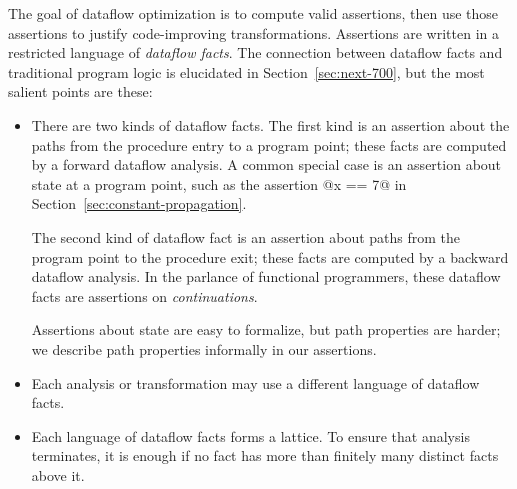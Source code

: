 \documentclass[blockstyle,preprint,nocopyrightspace]{sigplanconf}
\newcommand{\authornote}[1]{{\em #1}}
\def\authornote#1{\unskip\relax}
\newcommand{\simon}[1]{\authornote{SLPJ: #1}}
\newcommand{\john}[1]{\authornote{JD: #1}}
\newcommand\secref[1]{Section~\ref{sec:#1}}
\begin{document}
The goal of dataflow optimization is to compute valid
assertions, then use those assertions to justify code-improving
transformations.
%
%
Assertions are written in a restricted
language of \emph{dataflow facts}.\john{Almost sounds like we're restricting the language}
\simon{Exactly!  That was one reason I rewrote this stuff on Weds.}
The connection between dataflow facts and
\ifpagetuning\else traditional \fi
program logic is
elucidated in \secref{next-700}, but the most salient points are
these:
\begin{itemize}
\item
There are two kinds of dataflow facts.
The first kind is an assertion about the paths from the procedure
entry to a program point;
these facts are computed by a forward dataflow analysis.
A common special case is an assertion about state at a program point,
such as the assertion @x == 7@ in \secref{constant-propagation}.

The second kind of dataflow fact is an assertion about paths from the program point
to the procedure exit;
these facts are computed by a backward dataflow analysis.
In the parlance of functional programmers, these dataflow facts are assertions on
\emph{continuations}.

Assertions about state are easy to formalize, but path properties are harder;
we describe path properties informally in our assertions.
\simon{Shall we mention that typically forward
analysis use the former and backwards the latter?}
\simon{Side remark (not for paper): I was wondering about the difference
between ``state'' and ``continuation'', why so different?  Actually it
is perhaps not so different.  In a backward analysis, an 
assertion tells you something about what will happen from this 
program point onwards; in a forward analysis the assertion tells you
something about what has happened up to this point.
In general, a forward analysis could compute more stuff than assertions
about the program state at this moment in time; for example, you could
approximate the number of times a variable x has been written so far, something
that would not normally be considered part of the ``state'' of the program.
Now the two look more dual.}
\john{Indeed, this was a problem. I think we've addressed the latter comment now.}
\simon{Yes, better.}
\item
Each analysis or transformation may use a different language of
dataflow facts.
\item
Each language of dataflow facts forms a lattice.
To ensure that analysis terminates,
it is enough if
no fact has more than finitely many distinct facts above it.
\end{itemize}
\end{document}
